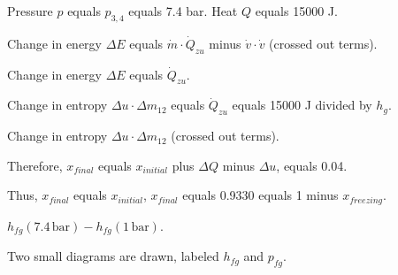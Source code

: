 Pressure \( p \) equals \( p_{3,4} \) equals 7.4 bar.  
Heat \( Q \) equals 15000 J.  

Change in energy \( \Delta E \) equals \( \dot{m} \cdot \dot{Q}_{zu} \) minus \( \dot{v} \cdot \dot{v} \) (crossed out terms).  

Change in energy \( \Delta E \) equals \( \dot{Q}_{zu} \).  

Change in entropy \( \Delta u \cdot \Delta m_{12} \) equals \( \dot{Q}_{zu} \) equals 15000 J divided by \( h_g \).  

Change in entropy \( \Delta u \cdot \Delta m_{12} \) (crossed out terms).  

Therefore, \( x_{final} \) equals \( x_{initial} \) plus \( \Delta Q \) minus \( \Delta u \), equals 0.04.  

Thus, \( x_{final} \) equals \( x_{initial} \), \( x_{final} \) equals 0.9330 equals 1 minus \( x_{freezing} \).  

\( h_{fg}(7.4 \, \text{bar}) - h_{fg}(1 \, \text{bar}) \).  

Two small diagrams are drawn, labeled \( h_{fg} \) and \( p_{fg} \).